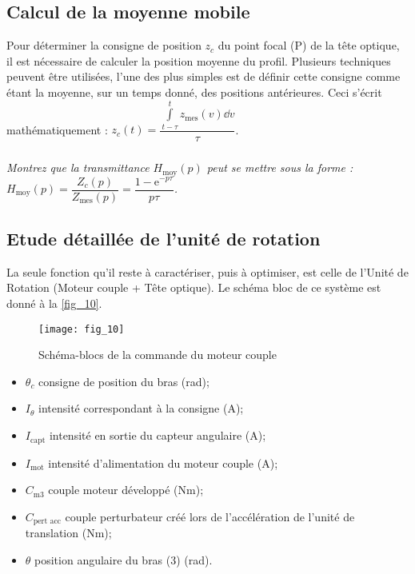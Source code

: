 \subsection{Calcul de la moyenne mobile}

Pour déterminer la consigne de position $z_c$ du point focal (P) de la tête optique, il est nécessaire de
calculer la position moyenne du profil. Plusieurs techniques peuvent être utilisées, l’une des plus simples
est de définir cette consigne comme étant la moyenne, sur un temps donné, des positions antérieures. Ceci
s’écrit mathématiquement : $z_c(t)=\dfrac{\int\limits_{t-\tau}^{t}z_{\text{mes}}(v)\dd v}{\tau}$.



\subparagraph{\label{q_}}\textit{Montrez que la transmittance $H_{\text{moy}}(p)$ peut se mettre sous la forme :
$H_{\text{moy}}(p) = \dfrac{Z_c(p)}{Z_{\text{mes}}(p)}=\dfrac{1-\text{e}^{-p\tau}}{p \tau}$.}

\subsection{Etude détaillée de l'unité de rotation}


La seule fonction qu’il reste à caractériser, puis à optimiser, est celle de l’Unité de Rotation (Moteur
couple + Tête optique). Le schéma bloc de ce système est donné à la \autoref{fig_10}.


\begin{figure}[H]
\centering
\texttt{[image: fig\_10]}
\caption{\label{fig_10} Schéma-blocs de la commande du moteur couple}
\end{figure}


\begin{multicols}{2}
\begin{itemize}
\item $\theta_c$ consigne de position du bras (rad);
\item $I_{\theta}$ intensité correspondant à la consigne (A);
\item $I_{\text{capt}}$ intensité en sortie du capteur angulaire (A);
\item $I_{\text{mot}}$ intensité d’alimentation du moteur couple (A);
\item $C_{\text{m3}}$ couple moteur développé (Nm);
\item $C_{\text{pert acc}}$ couple perturbateur créé lors de l’accélération de
l’unité de translation (Nm);
\item $\theta$ position angulaire du bras (3) (rad).
\end{itemize}
\end{multicols}

